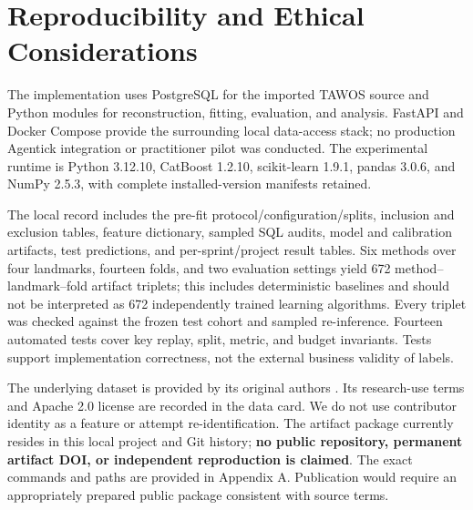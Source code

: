 \section{Reproducibility and Ethical Considerations}\label{reproducibility-and-ethical-considerations}

The implementation uses PostgreSQL for the imported TAWOS source and Python modules for reconstruction, fitting, evaluation, and analysis. FastAPI and Docker Compose provide the surrounding local data-access stack; no production Agentick integration or practitioner pilot was conducted. The experimental runtime is Python 3.12.10, CatBoost 1.2.10, scikit-learn 1.9.1, pandas 3.0.6, and NumPy 2.5.3, with complete installed-version manifests retained.

The local record includes the pre-fit protocol/configuration/splits, inclusion and exclusion tables, feature dictionary, sampled SQL audits, model and calibration artifacts, test predictions, and per-sprint/project result tables. Six methods over four landmarks, fourteen folds, and two evaluation settings yield 672 method--landmark--fold artifact triplets; this includes deterministic baselines and should not be interpreted as 672 independently trained learning algorithms. Every triplet was checked against the frozen test cohort and sampled re-inference. Fourteen automated tests cover key replay, split, metric, and budget invariants. Tests support implementation correctness, not the external business validity of labels.

The underlying dataset is provided by its original authors \cite{tawosi2022tawos,tawosv11}. Its research-use terms and Apache 2.0 license are recorded in the data card. We do not use contributor identity as a feature or attempt re-identification. The artifact package currently resides in this local project and Git history; \textbf{no public repository, permanent artifact DOI, or independent reproduction is claimed}. The exact commands and paths are provided in Appendix A. Publication would require an appropriately prepared public package consistent with source terms.
